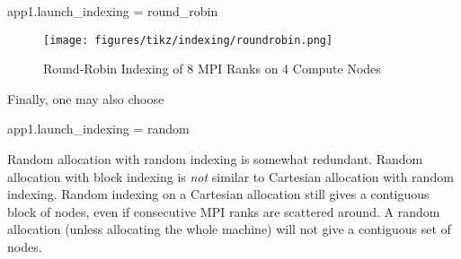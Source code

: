 \begin{ViFile}
app1.launch_indexing = round_robin
\end{ViFile}
\begin{figure}[h]
\centering
\texttt{[image: figures/tikz/indexing/roundrobin.png]}
\caption{Round-Robin Indexing of 8 MPI Ranks on 4 Compute Nodes}
\label{fig:indexing:round_robin}
\end{figure}
Finally, one may also choose

\begin{ViFile}
app1.launch_indexing = random
\end{ViFile}
Random allocation with random indexing is somewhat redundant.  
Random allocation with block indexing is \emph{not} similar to Cartesian allocation with random indexing.
Random indexing on a Cartesian allocation still gives a contiguous block of nodes,
even if consecutive MPI ranks are scattered around.
A random allocation (unless allocating the whole machine) will not give a contiguous set of nodes.
